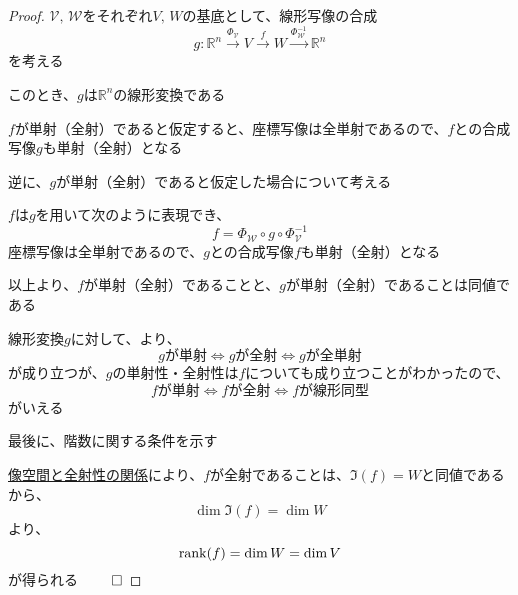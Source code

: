 \documentclass[../../../topic_linear-algebra]{subfiles}
\begin{document}
\begin{proof}
  $\mathcal{V},\,\mathcal{W}$をそれぞれ$V,\,W$の基底として、線形写像の合成
  \begin{equation*}
    g\colon \mathbb{R}^n \xrightarrow{\Phi_\mathcal{V}} V \xrightarrow{f} W \xrightarrow{\Phi_\mathcal{W}^{-1}} \mathbb{R}^n
  \end{equation*}
  を考える

  このとき、$g$は$\mathbb{R}^n$の線形変換である

  \br

  $f$が単射（全射）であると仮定すると、座標写像は全単射であるので、$f$との合成写像$g$も単射（全射）となる

  \br

  逆に、$g$が単射（全射）であると仮定した場合について考える

  $f$は$g$を用いて次のように表現でき、
  \begin{equation*}
    f = \Phi_\mathcal{W} \circ g \circ \Phi_\mathcal{V}^{-1}
  \end{equation*}
  座標写像は全単射であるので、$g$との合成写像$f$も単射（全射）となる

  \br

  以上より、$f$が単射（全射）であることと、$g$が単射（全射）であることは同値である

  \br

  線形変換$g$に対して、より、
  \begin{equation*}
    g\text{が単射} \Longleftrightarrow g\text{が全射} \Longleftrightarrow g\text{が全単射}
  \end{equation*}
  が成り立つが、$g$の単射性・全射性は$f$についても成り立つことがわかったので、
  \begin{equation*}
    f\text{が単射} \Longleftrightarrow f\text{が全射} \Longleftrightarrow f\text{が線形同型}
  \end{equation*}
  がいえる

  \br

  最後に、階数に関する条件を示す

  \hyperref[sec:image-and-surjectivity]{像空間と全射性の関係}により、$f$が全射であることは、$\Im(f) = W$と同値であるから、
  \begin{equation*}
    \dim \Im(f) = \dim W
  \end{equation*}
  より、
  \begin{equation*}
    \rank(f) = \dim W = \dim V
  \end{equation*}
  が得られる $\qed$
\end{proof}
\end{document}
